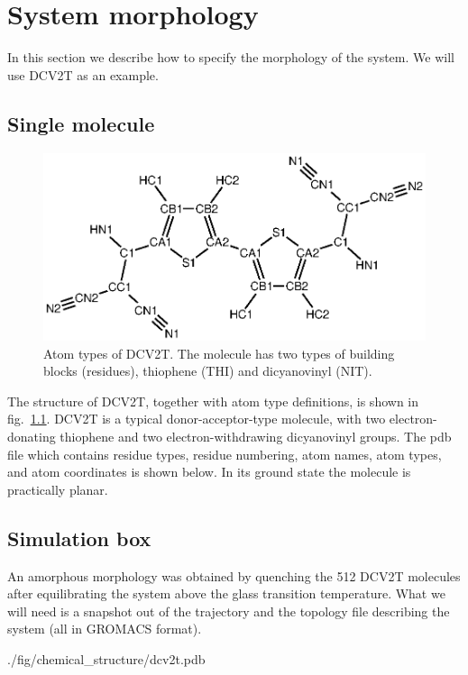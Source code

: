 \chapter{System morphology}
In this section we describe how to specify the morphology of the system. We will use DCV2T as an example.

\section{Single molecule}

\begin{figure}
\centering
\includegraphics[width=0.9\linewidth]{./fig/chemical_structure/dcv2t_atom_types}
\caption{\small Atom types of DCV2T. The molecule has two types of building blocks (residues), thiophene (THI) and dicyanovinyl (NIT). }
\label{fig:dcv2t_at}
\end{figure}

The structure of DCV2T, together with atom type definitions, is shown in fig.~\ref{fig:dcv2t_at}. DCV2T is a typical donor-acceptor-type molecule, with two electron-donating thiophene and two electron-withdrawing dicyanovinyl groups. The pdb file which contains residue types, residue numbering, atom names, atom types, and atom coordinates is shown below. In its ground state the molecule is practically planar. 

\section{Simulation box}
An amorphous morphology was obtained by quenching the 512 DCV2T molecules after equilibrating the system above the glass transition temperature. What we will need is a snapshot out of the trajectory and the topology file describing the system (all in GROMACS format).

\clearpage
%
{./fig/chemical_structure/dcv2t.pdb}

